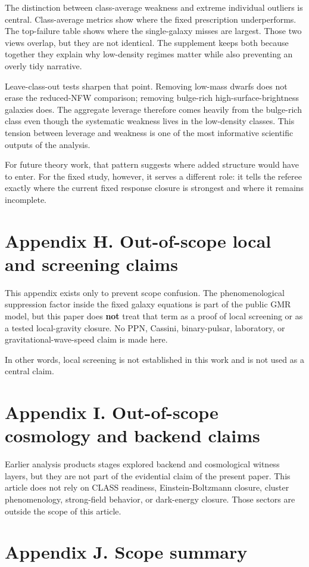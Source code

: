 \documentclass[twocolumn]{aastex701}
\begin{document}
The distinction between class-average weakness and extreme individual outliers is central. Class-average metrics show where the fixed prescription underperforms. The top-failure table shows where the single-galaxy misses are largest. Those two views overlap, but they are not identical. The supplement keeps both because together they explain why low-density regimes matter while also preventing an overly tidy narrative.

Leave-class-out tests sharpen that point. Removing low-mass dwarfs does not erase the reduced-NFW comparison; removing bulge-rich high-surface-brightness galaxies does. The aggregate leverage therefore comes heavily from the bulge-rich class even though the systematic weakness lives in the low-density classes. This tension between leverage and weakness is one of the most informative scientific outputs of the analysis.

For future theory work, that pattern suggests where added structure would have to enter. For the fixed study, however, it serves a different role: it tells the referee exactly where the current fixed response closure is strongest and where it remains incomplete.
\section{Appendix H. Out-of-scope local and screening claims}

This appendix exists only to prevent scope confusion. The phenomenological suppression factor inside the fixed galaxy equations is part of the public GMR model, but this paper does \textbf{not} treat that term as a proof of local screening or as a tested local-gravity closure. No PPN, Cassini, binary-pulsar, laboratory, or gravitational-wave-speed claim is made here.

In other words, local screening is not established in this work and is not used as a central claim.
\section{Appendix I. Out-of-scope cosmology and backend claims}

Earlier analysis products stages explored backend and cosmological witness layers, but they are not part of the evidential claim of the present paper. This article does not rely on CLASS readiness, Einstein-Boltzmann closure, cluster phenomenology, strong-field behavior, or dark-energy closure. Those sectors are outside the scope of this article.
\section{Appendix J. Scope summary}
\end{document}
